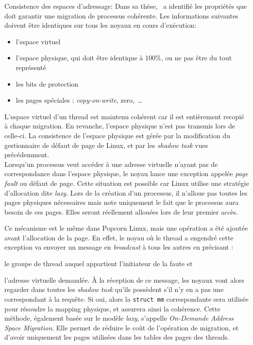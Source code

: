       \begin{paragraph}{Consistence des espaces d'adressage:}
        Dans sa thèse,~\citeauthor{katz2013popcorn} a identifié les propriétés
        que doit garantir une migration de processus cohérente. Les informations
        suivantes doivent être identiques sur tous les noyaux en cours
        d'exécution:
        \begin{itemize}
          \item l'espace virtuel
          \item l'espace physique, qui doit être identique à 100\%, ou ne pas
            être du tout représenté
          \item les bits de protection
          \item les pages spéciales : \textit{copy-on-write}, zero,~\ldots\\
        \end{itemize}

        L'espace virtuel d'un thread est maintenu cohérent car il est
        entièrement recopié à chaque migration. En revanche, l'espace physique
        n'est pas transmis lors de celle-ci. La consistence de l'espace physique
        est gérée par la modification du gestionnaire de défaut de page de
        Linux, et par les \textit{shadow task} vues précédemment.\\

        Lorsqu'un processus veut accéder à une adresse virtuelle n'ayant pas de
        correspondance dans l'espace physique, le noyau lance une exception
        appelée \textit{page fault} ou défaut de page. Cette situation est
        possible car Linux utilise une stratégie d'allocation dite
        \textit{lazy}. Lors de la création d'un processus, il n'alloue pas
        toutes les pages physiques nécessaires mais note uniquement le fait que
        le processus aura besoin de ces pages. Elles seront réellement allouées
        lors de leur premier accès.

        Ce mécanisme est le même dans Popcorn Linux, mais une opération a été
        ajoutée avant l'allocation de la page. En effet, le noyau où le thread a
        engendré cette exception va envoyer un message en \textit{broadcast} à
        tous les autres en précisant :\benumline \item le groupe de thread
        auquel appartient l'initiateur de la faute et \item l'adresse virtuelle
        demandée\eenumline. À la réception de ce message, les noyaux vont alors
        regarder dans toutes les \textit{shadow task} qu'ils possèdent s'il n'y
        en a pas une correspondant à la requête. Si oui, alors la \texttt{struct
          mm} correspondante sera utilisée pour résoudre la mapping physique, et
        assurera ainsi la cohérence. Cette méthode, également basée sur le
        modèle \textit{lazy}, s'appelle \textit{On-Demande Address Space
          Migration}. Elle permet de réduire le coût de l'opération de
        migration, et d'avoir uniquement les pages utilisées dans les tables
        des pages des threads.


\end{paragraph}
